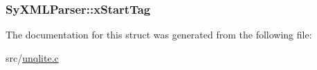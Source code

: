 \hypertarget{struct_sy_x_m_l_parser_ae2a2551a577ac075482d746023504212}{
\subsubsection[{x\-Start\-Tag}]{ Sy\-X\-M\-L\-Parser\-::x\-Start\-Tag}}\label{df/d7b/struct_sy_x_m_l_parser_ae2a2551a577ac075482d746023504212}


The documentation for this struct was generated from the following file\-:\begin{DoxyCompactItemize}
\item 
src/\hyperlink{unqlite_8c}{unqlite.\-c}\end{DoxyCompactItemize}
